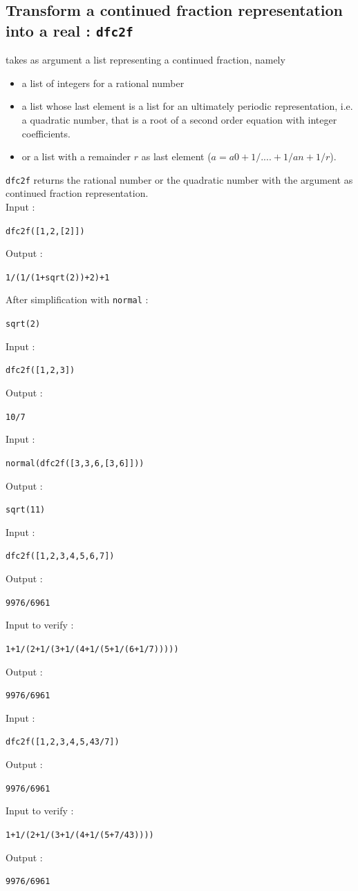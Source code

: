 \documentclass[a4paper,11pt]{book}
\begin{document}
\subsection{Transform a continued fraction representation into a real : {\tt dfc2f}}
 takes as argument a list representing a continued 
fraction, namely
\begin{itemize}
\item a list of integers for a rational number 
\item a list whose last element is a list for an
ultimately periodic representation, i.e.
a quadratic number, that is a root of a second order equation with
integer coefficients.
\item or a list with a remainder $r$ as last element
 ($a=a0+1/....+1/an+1/r$).
\end{itemize}
{\tt dfc2f} returns the rational number or the quadratic number with the 
argument as continued fraction representation.\\
Input :
\begin{center}{\tt dfc2f([1,2,[2]])}\end{center}
Output :
\begin{center}{\tt 1/(1/(1+sqrt(2))+2)+1}\end{center} 
After simplification with {\tt normal} :
\begin{center}{\tt sqrt(2)}\end{center} 
Input :
\begin{center}{\tt dfc2f([1,2,3])}\end{center}
Output :
\begin{center}{\tt 10/7}\end{center} 
Input :
\begin{center}{\tt normal(dfc2f([3,3,6,[3,6]]))}\end{center}
Output :
\begin{center}{\tt sqrt(11)}\end{center} 
Input :
\begin{center}{\tt dfc2f([1,2,3,4,5,6,7])}\end{center}
Output :
\begin{center}{\tt 9976/6961}\end{center} 
Input to verify :
\begin{center}{\tt 1+1/(2+1/(3+1/(4+1/(5+1/(6+1/7)))))}\end{center}
Output :
\begin{center}{\tt 9976/6961}\end{center}
Input :
\begin{center}{\tt dfc2f([1,2,3,4,5,43/7])}\end{center}
Output :
\begin{center}{\tt 9976/6961}\end{center} 
Input to verify :
\begin{center}{\tt 1+1/(2+1/(3+1/(4+1/(5+7/43))))}\end{center}
Output :
\begin{center}{\tt 9976/6961}\end{center}
\end{document}
